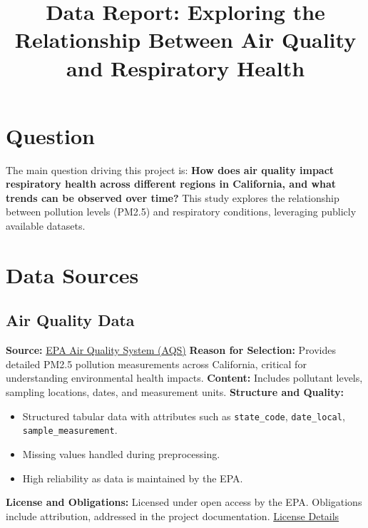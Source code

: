 \documentclass[a4paper,12pt]{article}
\title{Data Report: Exploring the Relationship Between Air Quality and Respiratory Health}
\author{}
\date{}
\begin{document}
\maketitle

\section*{Question}
The main question driving this project is:  
\textbf{How does air quality impact respiratory health across different regions in California, and what trends can be observed over time?}  
This study explores the relationship between pollution levels (PM2.5) and respiratory conditions, leveraging publicly available datasets.

\section*{Data Sources}

\subsection*{Air Quality Data}
\textbf{Source:} \href{https://aqs.epa.gov/aqsweb/documents/data_api.html}{EPA Air Quality System (AQS)}  
\textbf{Reason for Selection:} Provides detailed PM2.5 pollution measurements across California, critical for understanding environmental health impacts.  
\textbf{Content:} Includes pollutant levels, sampling locations, dates, and measurement units.  
\textbf{Structure and Quality:}
\begin{itemize}
    \item Structured tabular data with attributes such as \texttt{state\_code}, \texttt{date\_local}, \texttt{sample\_measurement}.
    \item Missing values handled during preprocessing.
    \item High reliability as data is maintained by the EPA.
\end{itemize}
\textbf{License and Obligations:}  
Licensed under open access by the EPA. Obligations include attribution, addressed in the project documentation.  
\href{https://data.gov/open-gov/}{License Details}
\end{document}
